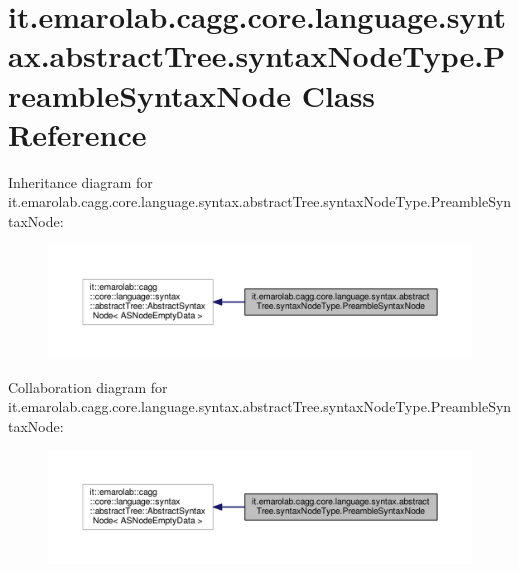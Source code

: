 \hypertarget{classit_1_1emarolab_1_1cagg_1_1core_1_1language_1_1syntax_1_1abstractTree_1_1syntaxNodeType_1_1PreambleSyntaxNode}{\section{it.\-emarolab.\-cagg.\-core.\-language.\-syntax.\-abstract\-Tree.\-syntax\-Node\-Type.\-Preamble\-Syntax\-Node Class Reference}
\label{classit_1_1emarolab_1_1cagg_1_1core_1_1language_1_1syntax_1_1abstractTree_1_1syntaxNodeType_1_1PreambleSyntaxNode}
}


Inheritance diagram for it.\-emarolab.\-cagg.\-core.\-language.\-syntax.\-abstract\-Tree.\-syntax\-Node\-Type.\-Preamble\-Syntax\-Node\-:\nopagebreak
\begin{figure}[H]
\begin{center}
\leavevmode
\includegraphics[width=350pt]{classit_1_1emarolab_1_1cagg_1_1core_1_1language_1_1syntax_1_1abstractTree_1_1syntaxNodeType_1_1P6a3de2b137481a9940eb4c465416a014}
\end{center}
\end{figure}


Collaboration diagram for it.\-emarolab.\-cagg.\-core.\-language.\-syntax.\-abstract\-Tree.\-syntax\-Node\-Type.\-Preamble\-Syntax\-Node\-:\nopagebreak
\begin{figure}[H]
\begin{center}
\leavevmode
\includegraphics[width=350pt]{classit_1_1emarolab_1_1cagg_1_1core_1_1language_1_1syntax_1_1abstractTree_1_1syntaxNodeType_1_1PreambleSyntaxNode__coll__graph}
\end{center}
\end{figure}

